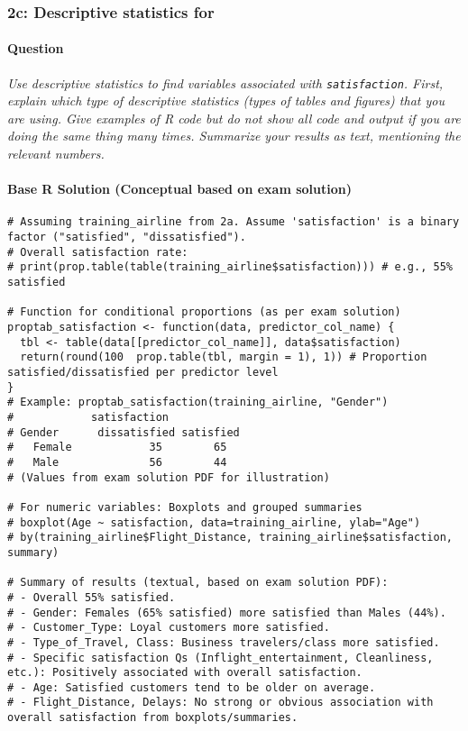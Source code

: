 \documentclass[12pt,a4paper]{article}
\newcommand{\Rcode}[1]{\texttt{#1}} %
\begin{document}
    \subsubsection{2c: Descriptive statistics for}
        \paragraph{Question}
        \textit{Use descriptive statistics to find variables associated with \Rcode{satisfaction}. First, explain which type of descriptive statistics (types of tables and figures) that you are using. Give examples of R code but do not show all code and output if you are doing the same thing many times. Summarize your results as text, mentioning the relevant numbers.}
        \paragraph{Base R Solution (Conceptual based on exam solution)}
\begin{lstlisting}
# Assuming training_airline from 2a. Assume 'satisfaction' is a binary factor ("satisfied", "dissatisfied").
# Overall satisfaction rate:
# print(prop.table(table(training_airline$satisfaction))) # e.g., 55% satisfied

# Function for conditional proportions (as per exam solution)
proptab_satisfaction <- function(data, predictor_col_name) {
  tbl <- table(data[[predictor_col_name]], data$satisfaction)
  return(round(100  prop.table(tbl, margin = 1), 1)) # Proportion satisfied/dissatisfied per predictor level
}
# Example: proptab_satisfaction(training_airline, "Gender")
#            satisfaction
# Gender      dissatisfied satisfied
#   Female            35        65
#   Male              56        44
# (Values from exam solution PDF for illustration)

# For numeric variables: Boxplots and grouped summaries
# boxplot(Age ~ satisfaction, data=training_airline, ylab="Age")
# by(training_airline$Flight_Distance, training_airline$satisfaction, summary)

# Summary of results (textual, based on exam solution PDF):
# - Overall 55% satisfied.
# - Gender: Females (65% satisfied) more satisfied than Males (44%).
# - Customer_Type: Loyal customers more satisfied.
# - Type_of_Travel, Class: Business travelers/class more satisfied.
# - Specific satisfaction Qs (Inflight_entertainment, Cleanliness, etc.): Positively associated with overall satisfaction.
# - Age: Satisfied customers tend to be older on average.
# - Flight_Distance, Delays: No strong or obvious association with overall satisfaction from boxplots/summaries.
\end{lstlisting}
\end{document}
